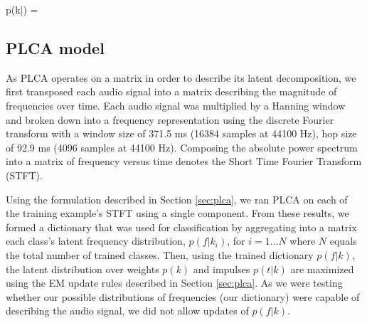 \documentclass[a4paper,10pt,final]{ThesisStyle}
\begin{document}
\begin{equationb}
p(k|) =   
\end{equationb}

\subsection{PLCA model}

As PLCA operates on a matrix in order to describe its latent decomposition, we first transposed each audio signal into a matrix describing the magnitude of frequencies over time.  Each audio signal was multiplied by a Hanning window and broken down into a frequency representation using the discrete Fourier transform with a window size of 371.5 ms (16384 samples at 44100 Hz), hop size of 92.9 ms (4096 samples at 44100 Hz).  Composing the absolute power spectrum into a matrix of frequency versus time denotes the Short Time Fourier Transform (STFT).

Using the formulation described in Section \ref{sec:plca}, we ran PLCA on each of the training example's STFT using a single component.  From these results, we formed a dictionary that was used for classification by aggregating into a matrix each class's latent frequency distribution, $p(f|k_i)$, for $i = {1...N}$ where $N$ equals the total number of trained classes.  Then, using the trained dictionary $p(f|k)$, the latent distribution over weights $p(k)$ and impulses $p(t|k)$ are maximized using the EM update rules described in Section \ref{sec:plca}.  As we were testing whether our possible distributions of frequencies (our dictionary) were capable of describing the audio signal, we did not allow updates of $p(f|k)$.

\end{document}
